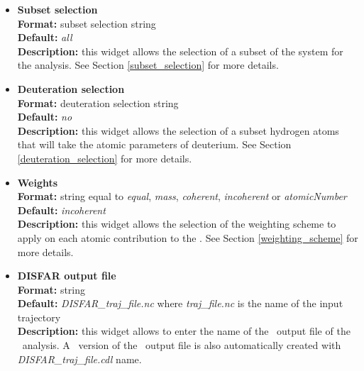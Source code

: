 \documentclass[a4paper,11pt]{report}
\begin{document}
\begin{itemize}
\hypertarget{disfar_subset_selection}{}
\item \textbf{Subset selection}\\
\textbf{Format:} subset selection string\\
\textbf{Default:} \textit{all}\\
\textbf{Description:} this widget allows the selection of a subset of the system for the analysis. 
See Section \ref{subset_selection} for more details.

\hypertarget{disfar_deuteration_selection}{}
\item \textbf{Deuteration selection}\\
\textbf{Format:} deuteration selection string\\
\textbf{Default:} \textit{no}\\
\textbf{Description:} this widget allows the selection of a subset hydrogen atoms that will take the atomic parameters 
of deuterium. See Section \ref{deuteration_selection} for more details.

\hypertarget{disfar_weights}{}
\item \textbf{Weights}\\
\textbf{Format:} string equal to \textit{equal}, \textit{mass}, \textit{coherent}, \textit{incoherent} or \textit{atomicNumber}\\
\textbf{Default:} \textit{incoherent}\\
\textbf{Description:} this widget allows the selection of the weighting scheme to apply on each atomic contribution 
to the \DISFAR . See Section \ref{weighting_scheme} for more details. 

\hypertarget{disfar_disfar_output_file}{}
\item \textbf{DISFAR output file}\\
\textbf{Format:} string\\
\textbf{Default:} \textit{DISFAR\_traj\_file.nc} where \textit{traj\_file.nc} is the name of the input trajectory\\
\textbf{Description:} this widget allows to enter the name of the \NetCDF\ output file of the \DISFAR\ analysis. A \CDL\ 
version of the \NetCDF\ output file is also automatically created with \textit{DISFAR\_traj\_file.cdl} name.
\end{itemize}
\end{document}
